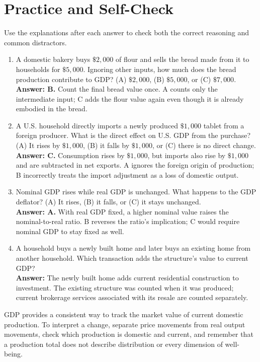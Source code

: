 \documentclass[11pt,letterpaper]{article}
\begin{document}
\section*{Practice and Self-Check}
Use the explanations after each answer to check both the correct reasoning and common distractors.
\begin{enumerate}
    \item A domestic bakery buys $\$2{,}000$ of flour and sells the bread made from it to households for $\$5{,}000$. Ignoring other inputs, how much does the bread production contribute to GDP? (A) $\$2{,}000$, (B) $\$5{,}000$, or (C) $\$7{,}000$.\\
    \textbf{Answer: B.} Count the final bread value once. A counts only the intermediate input; C adds the flour value again even though it is already embodied in the bread.

    \item A U.S. household directly imports a newly produced $\$1{,}000$ tablet from a foreign producer. What is the direct effect on U.S. GDP from the purchase? (A) It rises by $\$1{,}000$, (B) it falls by $\$1{,}000$, or (C) there is no direct change.\\
    \textbf{Answer: C.} Consumption rises by $\$1{,}000$, but imports also rise by $\$1{,}000$ and are subtracted in net exports. A ignores the foreign origin of production; B incorrectly treats the import adjustment as a loss of domestic output.

    \item Nominal GDP rises while real GDP is unchanged. What happens to the GDP deflator? (A) It rises, (B) it falls, or (C) it stays unchanged.\\
    \textbf{Answer: A.} With real GDP fixed, a higher nominal value raises the nominal-to-real ratio. B reverses the ratio's implication; C would require nominal GDP to stay fixed as well.

    \item A household buys a newly built home and later buys an existing home from another household. Which transaction adds the structure's value to current GDP?\\
    \textbf{Answer:} The newly built home adds current residential construction to investment. The existing structure was counted when it was produced; current brokerage services associated with its resale are counted separately.
\end{enumerate}

\begin{tcolorbox}[colback=yellow!10!white,colframe=orange!80!black,title=\textbf{Bring It Home: What GDP Can and Cannot Tell Us}]
GDP provides a consistent way to track the market value of current domestic production. To interpret a change, separate price movements from real output movements, check which production is domestic and current, and remember that a production total does not describe distribution or every dimension of well-being.
\end{tcolorbox}
\end{document}
